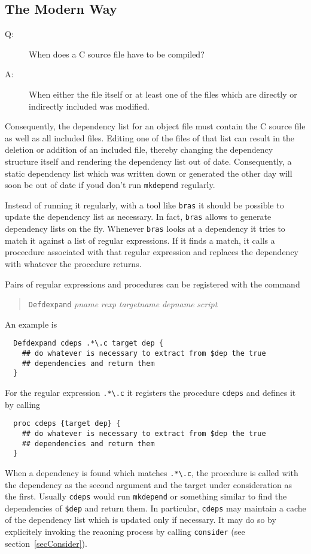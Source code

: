 \documentclass[12pt]{article}
\newcommand{\bras}{\texttt{bras}}
\begin{document}
\subsection{The Modern Way}
\label{secDepGen}
\begin{description}
\item[Q:] When does a C source file have to be compiled?
\item[A:] When either the file itself or at least one of the
  files which are directly or indirectly included was modified.
\end{description}
Consequently, the dependency list for an object file must contain the
C source file as well as all included files. Editing one of the files
of that list can result in the deletion or addition of an included
file, thereby changing the dependency structure itself and rendering
the dependency list out of date. Consequently, a static dependency
list which was written down or generated the other day will soon be
out of date if youd don't run \texttt{mkdepend} regularly. 

Instead of running it regularly, with a tool like \bras{} it should be
possible to update the dependency list as necessary. In fact, \bras{}
allows to generate dependency lists on the fly. Whenever \bras{} looks
at a dependency it tries to match it against a list of regular
expressions. If it finds a match, it calls a procecdure associated with
that regular expression and replaces the dependency with whatever the
procedure returns.

Pairs of regular expressions and procedures can be registered with the
command
\begin{quote}
  \texttt{Defdexpand} \textit{pname} \textit{rexp} \textit{targetname}
\textit{depname} \textit{script}
\end{quote}
An example is
\begin{verbatim}
  Defdexpand cdeps .*\.c target dep {
    ## do whatever is necessary to extract from $dep the true
    ## dependencies and return them
  }
\end{verbatim}
For the regular expression \verb|.*\.c| it registers the procedure
\texttt{cdeps} and defines it by calling
\begin{verbatim}
  proc cdeps {target dep} {
    ## do whatever is necessary to extract from $dep the true
    ## dependencies and return them
  }
\end{verbatim}
When a dependency is found which matches \verb|.*\.c|, the procedure
is called with the dependency as the second argument and the target
under consideration as the first.  Usually \texttt{cdeps} would run
\texttt{mkdepend} or something similar to find the dependencies of
\texttt{\$dep} and return them. In particular, \texttt{cdeps} may
maintain a cache of the dependency list which is updated only if
necessary. It may do so by explicitely invoking the reaoning process
by calling \texttt{consider} (see section~\ref{secConsider}).
\end{document}
